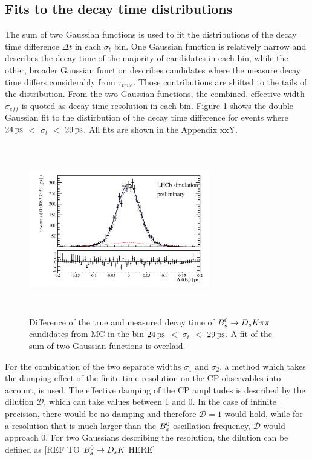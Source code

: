 \subsection{Fits to the decay time distributions}

The sum of two Gaussian functions is used to fit the distributions of the decay time difference $\Delta t$ in each $\sigma_{t}$ bin.
One Gaussian function is relatively narrow and describes the decay time of the majority of candidates in each bin, 
while the other, broader Gaussian function describes candidates where the measure decay time differs considerably from $\tau_{true}$. 
Those contributions are shifted to the tails of the distribution. From the two Gaussian functions, the combined, effective width $\sigma_{eff}$ is quoted as decay time resolution in each bin. 
Figure \ref{fig:ResoFit_24to29} shows the double Gaussian fit to the distirbution of the decay time difference for events where $24{\mathrm{ \,ps}}$ $<$ $\sigma_{t}$ $<$ $29{\mathrm{ \,ps}}$. All fits are shown in the Appendix xxY. \newline

\begin{figure}[h]
\includegraphics[height=7.4cm,width=0.7\textwidth]{figs/SignalMC_24to29.pdf}
\caption{Difference of the true and measured decay time of ${{B}^0_{s}}\rightarrow{\ensuremath{{D}_{s}}}{\ensuremath{K}}{\ensuremath{\pi}}{\ensuremath{\pi}}$ candidates from MC in the bin $24{\mathrm{ \,ps}}$ $<$ $\sigma_{t}$ $<$ $29{\mathrm{ \,ps}}$. A fit of the sum of two Gaussian functions is overlaid.}
\label{fig:ResoFit_24to29}
\end{figure}


For the combination of the two separate widths $\sigma_{1}$ and $\sigma_{2}$, a method which takes the damping effect of the finite time resolution on the CP observables into account, is used.
The effective damping of the CP amplitudes is described by the dilution $\mathcal{D}$, which can take values between 1 and 0. 
In the case of infinite precision, there would be no damping and therefore  $\mathcal{D} = 1$ would hold, while for a resolution that is much larger than the ${{B}^0_{s}}$ oscillation frequency, $\mathcal{D}$ would approach 0.
For two Gaussians describing the resolution, the dilution can be defined as [REF TO ${{B}^0_{s}}\rightarrow{\ensuremath{{D}_{s}}}{\ensuremath{K}}$ HERE]

